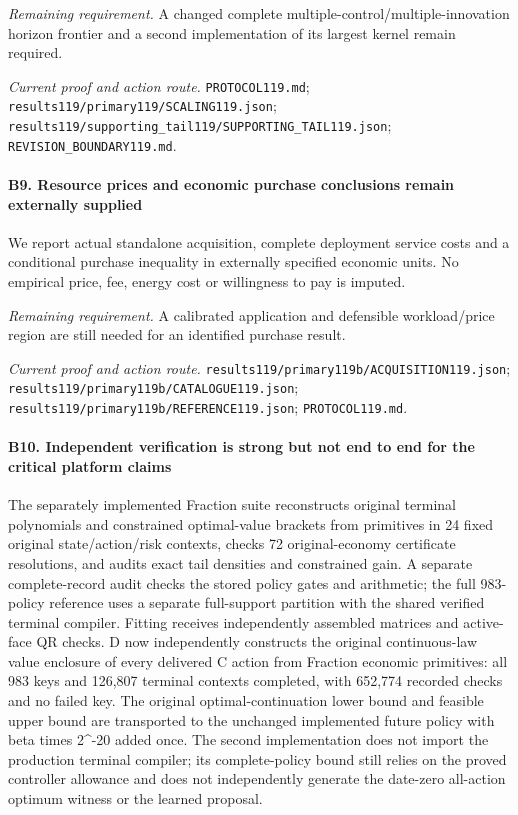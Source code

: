 \par\emph{Remaining requirement.} A changed complete multiple-control/\allowbreak{}multiple-innovation horizon frontier and a second implementation of its largest kernel remain required.

\par\emph{Current proof and action route.} \nolinkurl{PROTOCOL119.md}; \nolinkurl{results119/primary119/SCALING119.json}; \nolinkurl{results119/supporting_tail119/SUPPORTING_TAIL119.json}; \nolinkurl{REVISION_BOUNDARY119.md}.

\paragraph{B9. Resource prices and economic purchase conclusions remain externally supplied}

We report actual standalone acquisition, complete deployment service costs and a conditional purchase inequality in externally specified economic units. No empirical price, fee, energy cost or willingness to pay is imputed.

\par\emph{Remaining requirement.} A calibrated application and defensible workload/\allowbreak{}price region are still needed for an identified purchase result.

\par\emph{Current proof and action route.} \nolinkurl{results119/primary119b/ACQUISITION119.json}; \nolinkurl{results119/primary119b/CATALOGUE119.json}; \nolinkurl{results119/primary119b/REFERENCE119.json}; \nolinkurl{PROTOCOL119.md}.

\paragraph{B10. Independent verification is strong but not end to end for the critical platform claims}

The separately implemented Fraction suite reconstructs original terminal polynomials and constrained optimal-value brackets from primitives in 24 fixed original state/\allowbreak{}action/\allowbreak{}risk contexts, checks 72 original-economy certificate resolutions, and audits exact tail densities and constrained gain. A separate complete-record audit checks the stored policy gates and arithmetic; the full 983-policy reference uses a separate full-support partition with the shared verified terminal compiler. Fitting receives independently assembled matrices and active-face QR checks. D now independently constructs the original continuous-law value enclosure of every delivered C action from Fraction economic primitives: all 983 keys and 126,807 terminal contexts completed, with 652,774 recorded checks and no failed key. The original optimal-continuation lower bound and feasible upper bound are transported to the unchanged implemented future policy with beta times 2\textasciicircum{}-20 added once. The second implementation does not import the production terminal compiler; its complete-policy bound still relies on the proved controller allowance and does not independently generate the date-zero all-action optimum witness or the learned proposal.


